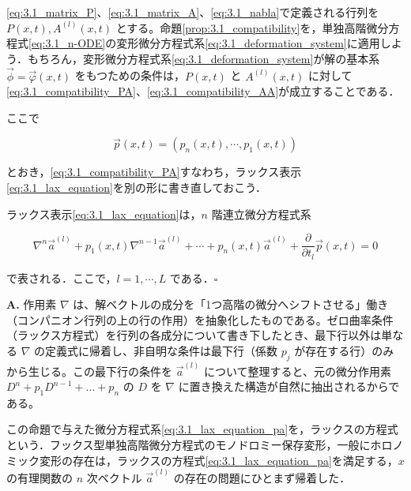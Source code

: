 \eqref{eq:3.1_matrix_P}、\eqref{eq:3.1_matrix_A}、\eqref{eq:3.1_nabla}で定義される行列を $P(x,t), A^{(l)}(x,t)$ とする。命題\ref{prop:3.1_compatibility}を，単独高階微分方程式\eqref{eq:3.1_n-ODE}の変形微分方程式系\eqref{eq:3.1_deformation_system}に適用しよう．もちろん，変形微分方程式系\eqref{eq:3.1_deformation_system}が解の基本系 $\vec{\phi}=\vec{\varphi}(x,t)$ をもつための条件は，$P(x,t)$ と $A^{(l)}(x,t)$ に対して\eqref{eq:3.1_compatibility_PA}、\eqref{eq:3.1_compatibility_AA}が成立することである．

ここで

\begin{equation}\label{eq:3.1_p_vector}
  \vec{p}(x,t) = (p_n(x,t), \cdots, p_1(x,t))
\end{equation}

とおき，\eqref{eq:3.1_compatibility_PA}すなわち，ラックス表示\eqref{eq:3.1_lax_equation}を別の形に書き直しておこう．

\begin{proposition}
ラックス表示\eqref{eq:3.1_lax_equation}は，$n$ 階連立微分方程式系

\begin{equation}\label{eq:3.1_lax_equation_pa}
  \nabla^n \vec{a}^{(l)} + p_1(x,t)\nabla^{n-1}\vec{a}^{(l)} + \cdots + p_n(x,t)\vec{a}^{(l)} + \frac{\partial}{\partial t_l}\vec{p}(x,t) = 0
\end{equation}

で表される．ここで，$l=1,\cdots,L$ である．\hfill $\square$
\end{proposition}

\begin{Q}
\textbf{A.} 作用素 $\nabla$ は、解ベクトルの成分を「1つ高階の微分へシフトさせる」働き（コンパニオン行列の上の行の作用）を抽象化したものである。ゼロ曲率条件（ラックス方程式）を行列の各成分について書き下したとき、最下行以外は単なる $\nabla$ の定義式に帰着し、非自明な条件は最下行（係数 $p_j$ が存在する行）のみから生じる。この最下行の条件を $\vec{a}^{(l)}$ について整理すると、元の微分作用素 $D^n + p_1 D^{n-1} + \dots + p_n$ の $D$ を $\nabla$ に置き換えた構造が自然に抽出されるからである。
\end{Q}

この命題で与えた微分方程式系\eqref{eq:3.1_lax_equation_pa}を，ラックスの方程式という．フックス型単独高階微分方程式のモノドロミー保存変形，一般にホロノミック変形の存在は，ラックスの方程式\eqref{eq:3.1_lax_equation_pa}を満足する，$x$ の有理関数の $n$ 次ベクトル $\vec{a}^{(l)}$ の存在の問題にひとまず帰着した．

